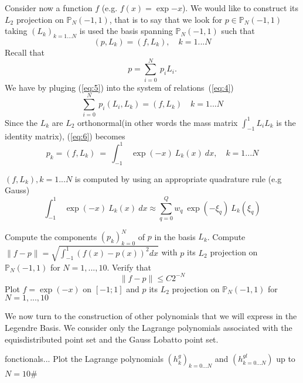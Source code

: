 \documentclass{article}
\begin{document}
\begin{Exercise}[title={p type Galerkin method in 1D}]
  \ExePart 
   Consider now a function $f$ (e.g. $f(x)=\exp{-x}$). We
  would like to construct its $L_2$ projection on
  $\mathbb{P}_N(-1,1)$, that is to say that we look for $p \in
  \mathbb{P}_N(-1,1)$ taking $(L_k)_{k=1...N}$ is used the basis spanning
  $\mathbb{P}_N(-1,1)$ such that
  \begin{equation}
    \label{eq:4}
    (p, L_k) = (f, L_k), \quad k=1...N
  \end{equation}
  Recall that 
  \begin{equation}
    \label{eq:5}
    p=\sum_{i=0}^N\ p_i L_i.
  \end{equation}
  We have by pluging (\ref{eq:5}) into the system of relations~(\ref{eq:4})
  \begin{equation}
    \label{eq:6}
    \sum_{i=0}^N\ p_i (L_i,L_k) = (f, L_k)\quad k=1...N
  \end{equation}
  Since the $L_k$ are $L_2$ orthonormal(in other words the mass matrix
  $\int_{-1}^1 L_i L_k$ is the identity matrix), (\ref{eq:6}) becomes
  \begin{equation}
    \label{eq:7}
    p_k = (f, L_k)\ =\ \int_{-1}^1\ \exp(-x)\ L_k(x)\ dx, \quad k=1...N
  \end{equation}

  $(f,L_k), k=1...N$ is computed by using an appropriate quadrature
  rule (e.g Gauss)
  \begin{equation}
    \label{eq:8}
    \int_{-1}^1\ \exp(-x)\ L_k(x)\ dx \approx \sum_{q=0}^Q w_q\ \exp(-\xi_q)\ L_k(\xi_q)
  \end{equation}
  
  \Question Compute the components $(p_k)_{k=0}^N$ of $p$ in the basis
  $L_k$.  
  \Question Compute $\|f-p\|=\sqrt{\int_{-1}^1 (f(x)-p(x))^2 dx}$ with $p$ its $L_2$ projection on
  $\mathbb{P}_N(-1,1)$ for $N=1,...,10$. Verify that
  \begin{equation}
    \label{eq:9}
    \|f-p\| \leq C 2^{-N}
  \end{equation}
  \Question Plot $f=\exp(-x)$
  on $[-1;1]$ and $p$ its $L_2$ projection on $\mathbb{P}_N(-1,1)$ for
  $N=1,...,10$
  
  \ExePart We now turn to the construction of other polynomials that
  we will express in the Legendre Basis. We consider only the Lagrange
  polynomials associated with the equisdistributed point set and the
  Gauss Lobatto point set.

  \Question fonctionals...
  \Question Plot the Lagrange polynomials $(h^g_k)_{k=0...N}$ and $(h^{gl}_{k=0...N})$ up to $N=10$# 


\end{Exercise}
\end{document}
